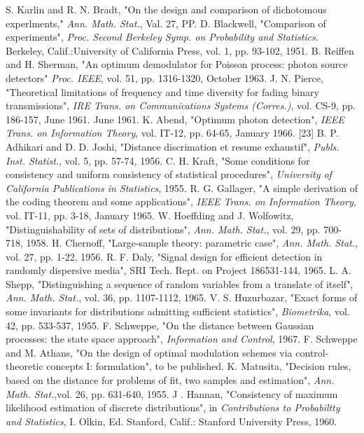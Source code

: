 \documentclass{sbrt2017port}
\begin{document}
\begin{thebibliography}{99}
 S. Karlin and R. N. Bradt, "On the design and comparison of dichotomous experlments," \textit{Ann. Math. Stat.}, Val. 27, PP.
 D. Blackwell, "Comparison of experiments", \textit{Proc. Second Berkeley Symp. on Probability and Statistics}. Berkeley, Calif.:University of California Press, vol. 1, pp. 93-102, 1951.
 B. Reiffen and H. Sherman, "An optimum demodulator for Poisson process: photon source detectors" \textit{Proc. IEEE}, vol. 51, pp. 1316-1320, October 1963.
 J. N. Pierce, "Theoretical limitations of frequency and time diversity for fading binary transmissions", \textit{IRE Trans. on Communications Systems (Corres.)}, vol. CS-9, pp. 186-157, June 1961.
June 1961.
 K. Abend, "Optimum photon detection", \textit{IEEE Trans. on Information Theory}, vol. IT-12, pp. 64-65, January 1966.
 [23] B. P. Adhikari and D. D. Joshi, "Distance discrimation et resume exhaustif", \textit{Publs. Inst. Statist.}, vol. 5, pp. 57-74, 1956.
 C. H. Kraft, "Some conditions for consistency and uniform consistency of statistical procedures", \textit{University of California Publications in Statistics}, 1955.
 R. G. Gallager, "A simple derivation of the coding theorem and some applications", \textit{IEEE Trans. on Information Theory}, vol. IT-11, pp. 3-18, January 1965.
 W. Hoeffding and J. Wolfowitz, "Distinguishability of sets of distributions", \textit{Ann. Math. Stat.}, vol. 29, pp. 700-718, 1958.
 H. Chernoff, "Large-sample theory: parametric case", \textit{Ann. Math. Stat.}, vol. 27, pp. 1-22, 1956.
 R. F. Daly, "Signal design for efficient detection in randomly dispersive media", SRI Tech. Rept. on Project 186531-144, 1965.
 L. A. Shepp, "Distinguishing a sequence of random variables from a translate of itself", \textit{Ann. Math. Stat.}, vol. 36, pp. 1107-1112, 1965.
 V. S. Huzurbazar, "Exact forms of some invariants for distributions admitting sufficient statistics", \textit{Biometrika}, vol. 42, pp. 533-537, 1955.
 F. Schweppe, "On the distance between Gaussian processes: the state space approach", \textit{Information and Control}, 1967.
 F. Schweppe and M. Athans, "On the design of optimal modulation schemes via control-theoretic concepts I: formulation", to be published.
 K. Matusita, "Decision rules, based on the distance for problems of fit, two samples and estimation", \textit{Ann. Math. Stat.},vol. 26, pp. 631-640, 1955.
 J . Hannan, "Consistency of maximum likelihood estimation of discrete distributions", in \textit{Contributions to Probabiltty and Statistics}, I. Olkin, Ed. Stanford, Calif.: Stanford University Press, 1960.

\end{thebibliography}
\end{document}
